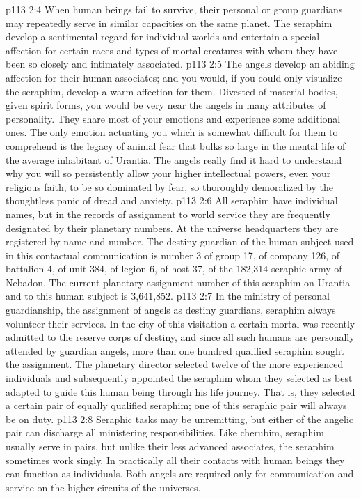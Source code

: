 \pc \vs p113 2:4 When human beings fail to survive, their personal or group guardians may repeatedly serve in similar capacities on the same planet. The seraphim develop a sentimental regard for individual worlds and entertain a special affection for certain races and types of mortal creatures with whom they have been so closely and intimately associated.
\vs p113 2:5 The angels develop an abiding affection for their human associates; and you would, if you could only visualize the seraphim, develop a warm affection for them. Divested of material bodies, given spirit forms, you would be very near the angels in many attributes of personality. They share most of your emotions and experience some additional ones. The only emotion actuating you which is somewhat difficult for them to comprehend is the legacy of animal fear that bulks so large in the mental life of the average inhabitant of Urantia. The angels really find it hard to understand why you will so persistently allow your higher intellectual powers, even your religious faith, to be so dominated by fear, so thoroughly demoralized by the thoughtless panic of dread and anxiety.
\pc \vs p113 2:6 All seraphim have individual names, but in the records of assignment to world service they are frequently designated by their planetary numbers. At the universe headquarters they are registered by name and number. The destiny guardian of the human subject used in this contactual communication is number 3 of group 17, of company 126, of battalion 4, of unit 384, of legion 6, of host 37, of the 182,314 seraphic army of Nebadon. The current planetary assignment number of this seraphim on Urantia and to this human subject is 3,641,852.
\pc \vs p113 2:7 In the ministry of personal guardianship, the assignment of angels as destiny guardians, seraphim always volunteer their services. In the city of this visitation a certain mortal was recently admitted to the reserve corps of destiny, and since all such humans are personally attended by guardian angels, more than one hundred qualified seraphim sought the assignment. The planetary director selected twelve of the more experienced individuals and subsequently appointed the seraphim whom they selected as best adapted to guide this human being through his life journey. That is, they selected a certain pair of equally qualified seraphim; one of this seraphic pair will always be on duty.
\vs p113 2:8 Seraphic tasks may be unremitting, but either of the angelic pair can discharge all ministering responsibilities. Like cherubim, seraphim usually serve in pairs, but unlike their less advanced associates, the seraphim sometimes work singly. In practically all their contacts with human beings they can function as individuals. Both angels are required only for communication and service on the higher circuits of the universes.
